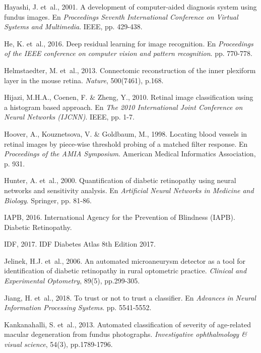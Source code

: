 \documentclass[
  12pt,
  spanish,
  a4paperpaper,
]{report}
\begin{document}
\leavevmode\hypertarget{ref-hayashi2001development}{}%
Hayashi, J. et~al., 2001. A development of computer-aided diagnosis
system using fundus images. En \emph{Proceedings Seventh International
Conference on Virtual Systems and Multimedia}. IEEE, pp. 429-438.

\leavevmode\hypertarget{ref-he2016deep}{}%
He, K. et~al., 2016. Deep residual learning for image recognition. En
\emph{Proceedings of the IEEE conference on computer vision and pattern
recognition}. pp. 770-778.

\leavevmode\hypertarget{ref-helmstaedter2013connectomic}{}%
Helmstaedter, M. et~al., 2013. Connectomic reconstruction of the inner
plexiform layer in the mouse retina. \emph{Nature}, 500(7461), p.168.

\leavevmode\hypertarget{ref-hijazi2010retinal}{}%
Hijazi, M.H.A., Coenen, F. \& Zheng, Y., 2010. Retinal image
classification using a histogram based approach. En \emph{The 2010
International Joint Conference on Neural Networks (IJCNN)}. IEEE, pp.
1-7.

\leavevmode\hypertarget{ref-hoover1998locating}{}%
Hoover, A., Kouznetsova, V. \& Goldbaum, M., 1998. Locating blood
vessels in retinal images by piece-wise threshold probing of a matched
filter response. En \emph{Proceedings of the AMIA Symposium}. American
Medical Informatics Association, p. 931.

\leavevmode\hypertarget{ref-hunter2000quantification}{}%
Hunter, A. et~al., 2000. Quantification of diabetic retinopathy using
neural networks and sensitivity analysis. En \emph{Artificial Neural
Networks in Medicine and Biology}. Springer, pp. 81-86.

\leavevmode\hypertarget{ref-IAPB}{}%
IAPB, 2016. International Agency for the Prevention of Blindness (IAPB).
Diabetic Retinopathy.

\leavevmode\hypertarget{ref-idf2017}{}%
IDF, 2017. IDF Diabetes Atlas 8th Edition 2017.

\leavevmode\hypertarget{ref-jelinek2006automated}{}%
Jelinek, H.J. et~al., 2006. An automated microaneurysm detector as a
tool for identification of diabetic retinopathy in rural optometric
practice. \emph{Clinical and Experimental Optometry}, 89(5), pp.299-305.

\leavevmode\hypertarget{ref-jiang2018trust}{}%
Jiang, H. et~al., 2018. To trust or not to trust a classifier. En
\emph{Advances in Neural Information Processing Systems}. pp. 5541-5552.

\leavevmode\hypertarget{ref-kankanahalli2013automated}{}%
Kankanahalli, S. et~al., 2013. Automated classification of severity of
age-related macular degeneration from fundus photographs.
\emph{Investigative ophthalmology \& visual science}, 54(3),
pp.1789-1796.
\end{document}

